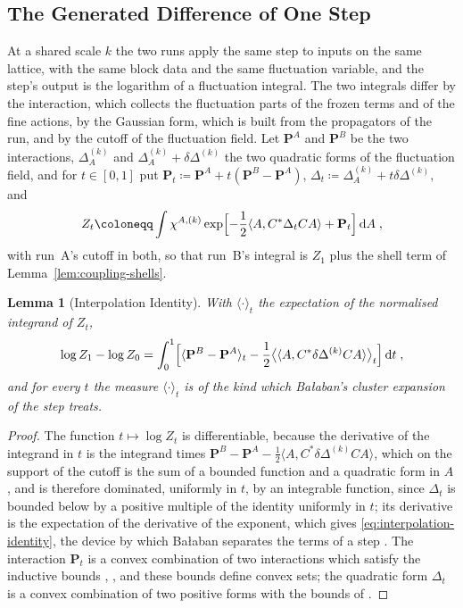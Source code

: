 \documentclass[11pt]{preprint}
\newcommand{\dd}{\mathrm{d}}
\numberwithin{equation}{section}
\newtheorem{lemma}[theorem]{Lemma}
\theoremstyle{definition}
\theoremstyle{remark}
\theoremstyle{plain}
\begin{document}
\subsection{The Generated Difference of One Step}\label{sec:recursion}

At a shared scale $k$ the two runs apply the same step to inputs on the same lattice, with the same block data and the same fluctuation variable, and the step's output is the logarithm of a fluctuation integral. The two integrals differ by the interaction, which collects the fluctuation parts of the frozen terms and of the fine actions, by the Gaussian form, which is built from the propagators of the run, and by the cutoff of the fluctuation field. Let $\mathbf P^A$ and $\mathbf P^B$ be the two interactions, $\Delta^{(k)}_A$ and $\Delta^{(k)}_A + \delta\Delta^{(k)}$ the two quadratic forms of the fluctuation field, and for $t \in [0, 1]$ put $\mathbf P_t \coloneqq \mathbf P^A + t(\mathbf P^B - \mathbf P^A)$, $\Delta_t \coloneqq \Delta^{(k)}_A + t\delta\Delta^{(k)}$, and
\begin{equation}\label{eq:interpolated-integral}
    Z_t \coloneqq \int\chi^{A,(k)}\exp\Bigl[-\frac12\langle A, C^*\Delta_tCA\rangle + \mathbf P_t\Bigr]\,\dd A\;,
\end{equation}
with run~A's cutoff in both, so that run~B's integral is $Z_1$ plus the shell term of Lemma~\ref{lem:coupling-shells}.

\begin{lemma}[Interpolation Identity]\label{lem:interpolation}
With $\langle\cdot\rangle_t$ the expectation of the normalised integrand of $Z_t$,
\begin{equation}\label{eq:interpolation-identity}
    \log Z_1 - \log Z_0 = \int_0^1\Bigl[\langle\mathbf P^B - \mathbf P^A\rangle_t - \frac12\bigl\langle\langle A, C^*\delta\Delta^{(k)}CA\rangle\bigr\rangle_t\Bigr]\,\dd t\;,
\end{equation}
and for every $t$ the measure $\langle\cdot\rangle_t$ is of the kind which Ba{\l}aban's cluster expansion of the step treats.
\end{lemma}

\begin{proof}
The function $t \mapsto \log Z_t$ is differentiable, because the derivative of the integrand in $t$ is the integrand times $\mathbf P^B - \mathbf P^A - \frac12\langle A, C^*\delta\Delta^{(k)}CA\rangle$, which on the support of the cutoff is the sum of a bounded function and a quadratic form in $A$, and is therefore dominated, uniformly in $t$, by an integrable function, since $\Delta_t$ is bounded below by a positive multiple of the identity uniformly in $t$; its derivative is the expectation of the derivative of the exponent, which gives \eqref{eq:interpolation-identity}, the device by which Ba{\l}aban separates the terms of a step \cite[(3.26)--(3.27), p.~271]{BalabanCRE}. The interaction $\mathbf P_t$ is a convex combination of two interactions which satisfy the inductive bounds \cite[(1.18), p.~263]{BalabanRG1}, \cite[(2.31), (2.42)]{BalabanCRE}, and these bounds define convex sets; the quadratic form $\Delta_t$ is a convex combination of two positive forms with the bounds of \cite[Theorems~3.1--3.3]{BalabanPBG}.
\end{proof}
\end{document}
